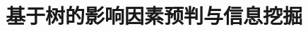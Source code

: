 \documentclass[UTF8,12pt]{ctexart}
\begin{document}



\title{基于树的影响因素预判与信息挖掘}



\author{} %
\date{} %
\maketitle %
\vspace{-4em}  %







\thispagestyle{empty}  %
\newpage  %



\pagestyle{fancy}
\fancyhead{} %
\fancyfoot{} %
\begin{center} \tableofcontents \end{center} 
\thispagestyle{empty}\newpage



\pagestyle{fancy} %
\fancyhead[R]{}
\fancyhead[C]{} %
\fancyhead[L]{} %
\fancyfoot[R]{} %
\fancyfoot[C]{- {\thepage}\ -} %
\fancyfoot[L]{} %
\setcounter{page}{1}  %
\end{document}
